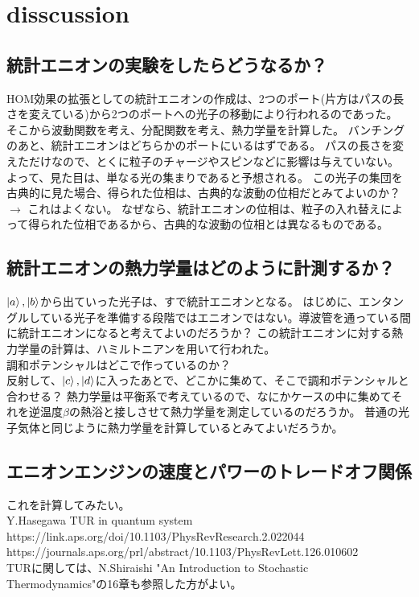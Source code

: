 \documentclass[a4paper,11pt]{jsarticle}
\numberwithin{equation}{section}
\begin{document}
\section{disscussion}

\subsection{統計エニオンの実験をしたらどうなるか？}
HOM効果の拡張としての統計エニオンの作成は、2つのポート(片方はパスの長さを変えている)から2つのポートへの光子の移動により行われるのであった。
そこから波動関数を考え、分配関数を考え、熱力学量を計算した。
バンチングのあと、統計エニオンはどちらかのポートにいるはずである。
パスの長さを変えただけなので、とくに粒子のチャージやスピンなどに影響は与えていない。
よって、見た目は、単なる光の集まりであると予想される。
この光子の集団を古典的に見た場合、得られた位相は、古典的な波動の位相だとみてよいのか？
$\to$ これはよくない。
なぜなら、統計エニオンの位相は、粒子の入れ替えによって得られた位相であるから、古典的な波動の位相とは異なるものである。

\subsection{統計エニオンの熱力学量はどのように計測するか？}
$\ket{a},\ket{b}$から出ていった光子は、すで統計エニオンとなる。
はじめに、エンタングルしている光子を準備する段階ではエニオンではない。導波管を通っている間に統計エニオンになると考えてよいのだろうか？
この統計エニオンに対する熱力学量の計算は、ハミルトニアンを用いて行われた。\\
調和ポテンシャルはどこで作っているのか？\\
反射して、$\ket{c},\ket{d}$に入ったあとで、どこかに集めて、そこで調和ポテンシャルと合わせる？
熱力学量は平衡系で考えているので、なにかケースの中に集めてそれを逆温度$\beta$の熱浴と接しさせて熱力学量を測定しているのだろうか。
普通の光子気体と同じように熱力学量を計算しているとみてよいだろうか。

\subsection{エニオンエンジンの速度とパワーのトレードオフ関係}
これを計算してみたい。\\
Y.Hasegawa TUR in quantum system\\
https://link.aps.org/doi/10.1103/PhysRevResearch.2.022044\\
https://journals.aps.org/prl/abstract/10.1103/PhysRevLett.126.010602\\
TURに関しては、N.Shiraishi "An Introduction to Stochastic Thermodynamics"の16章も参照した方がよい。
\end{document}
